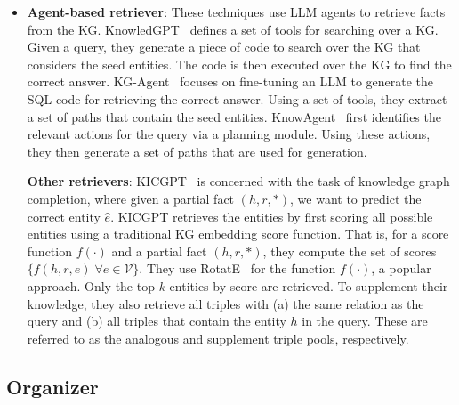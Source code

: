 \begin{itemize}[leftmargin=*]
    \item {\bf Agent-based retriever}: These techniques use LLM agents to retrieve facts from the KG. KnowledGPT~\cite{wang2023knowledgpt} defines a set of tools for searching over a KG. Given a query, they generate a piece of code to search over the KG that considers the seed entities. The code is then executed over the KG to find the correct answer. KG-Agent~\cite{kgagent} focuses on fine-tuning an LLM to generate the SQL code for retrieving the correct answer. Using a set of tools, they extract a set of paths that contain the seed entities. KnowAgent~\cite{zhu2024knowagent} first identifies the relevant actions for the query via a planning module. Using these actions, they then generate a set of paths that are used for generation. 

    {\bf Other retrievers}: KICGPT~\cite{kicgpt} is concerned with the task of knowledge graph completion, where given a partial fact $(h, r, *)$, we want to predict the correct entity $\hat{e}$. KICGPT retrieves the entities by first scoring all possible entities using a traditional KG embedding score function. That is, for a score function $f(\cdot)$ and a partial fact $(h, r, *)$, they compute the set of scores $\{f(h, r, e) \; \forall e \in \mathcal{V} \}$. They use RotatE~\cite{sunrotate} for the function  $f(\cdot)$, a popular approach. Only the top $k$ entities by score are retrieved. To supplement their knowledge, they also retrieve all triples with (a) the same relation as the query and (b) all triples that contain the entity $h$ in the query. These are referred to as the analogous and supplement triple pools, respectively.

\end{itemize}


\subsection{Organizer}

